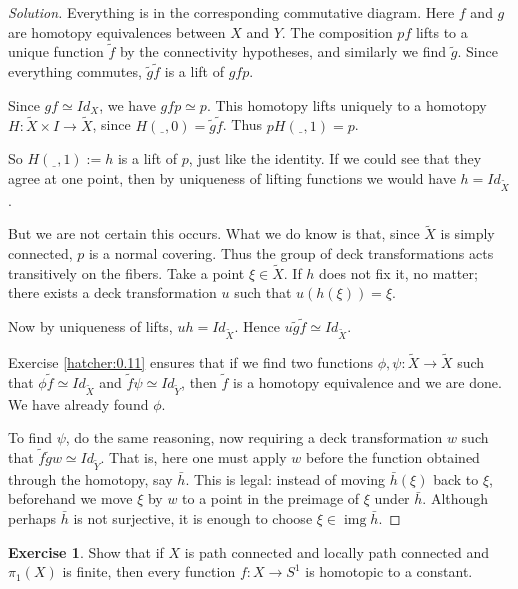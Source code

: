 \documentclass{book}
\theoremstyle{definition}
\newtheorem*{ejer}{Exercise}
\DeclareMathOperator{\img}{img}
\begin{document}
\begin{proof}[Solution]
Everything is in the corresponding commutative diagram. Here
$f$ and $g$ are homotopy equivalences between $X$ and $Y$.
The composition $pf$ lifts to a unique function $\tilde f$ by
the connectivity hypotheses, and similarly we find
$\tilde g$. Since everything commutes, $\tilde g\tilde f$ is
a lift of $gfp$.

Since $gf\simeq Id_X$, we have $gfp\simeq p$. This homotopy
lifts uniquely to a homotopy
$H:\tilde X\times I\to\tilde X$, since
$H(\underline{\hspace{5pt}},0)=\tilde g\tilde f$. Thus
$pH(\underline{\hspace{5pt}},1)=p$.

So $H(\underline{\hspace{5pt}},1):=h$ is a lift of $p$, just
like the identity. If we could see that they agree at one
point, then by uniqueness of lifting functions we would have
$h=Id_{\tilde X}$.

But we are not certain this occurs. What we do know is that,
since $\tilde X$ is simply connected, $p$ is a normal
covering. Thus the group of deck transformations acts
transitively on the fibers. Take a point $\xi\in\tilde X$. If
$h$ does not fix it, no matter; there exists a deck
transformation $u$ such that $u(h(\xi))=\xi$.

Now by uniqueness of lifts, $uh=Id_{\tilde X}$. Hence
$u\tilde g\tilde f\simeq Id_{\tilde X}$.

Exercise \ref{hatcher:0.11} ensures that if we find two
functions $\phi,\psi:\tilde X\to\tilde X$ such that
$\phi\tilde f\simeq Id_{\tilde X}$ and
$\tilde f\psi\simeq Id_{\tilde Y}$, then $\tilde f$ is a
homotopy equivalence and we are done. We have already found
$\phi$.

To find $\psi$, do the same reasoning, now requiring a deck
transformation $w$ such that
$\tilde f\tilde g w\simeq Id_{\tilde Y}$. That is, here one
must apply $w$ before the function obtained through the
homotopy, say $\bar h$. This is legal: instead of moving
$\bar h(\xi)$ back to $\xi$, beforehand we move $\xi$ by $w$
to a point in the preimage of $\xi$ under $\bar h$. Although
perhaps $\bar h$ is not surjective, it is enough to choose
$\xi\in\img\bar h$.
\end{proof}

\begin{ejer}
Show that if $X$ is path connected and locally path connected
and $\pi_1(X)$ is finite, then every function $f:X\to S^1$ is
homotopic to a constant.
\end{ejer}
\end{document}
